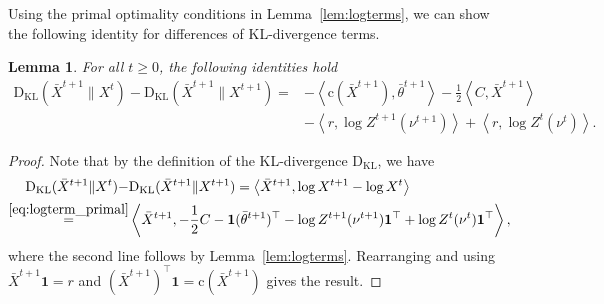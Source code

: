 \documentclass[10pt]{article}
\newcommand{\DHa}{\D_{H_c^\alpha}}
\newcommand{\inner}[2]{\left\langle #1,#2\right\rangle}
\newcommand{\D}{\operatorname{D}}
\theoremstyle{plain}
\newtheorem{lemma}[theorem]{Lemma}
\theoremstyle{definition}
\theoremstyle{remark}
\newcommand{\KL}{\mathrm{D}_\mathrm{KL}}
\newcommand{\one}{\mathbf{1}}
\newcommand{\col}{\bm{\mathrm{c}}}
\begin{document}
Using the primal optimality conditions in Lemma~\ref{lem:logterms}, we can show the following identity for differences of KL-divergence terms.
\begin{lemma}\label{lem:kl_diff}
    For all $t\geq 0$, the following identities hold
    \begin{align}
       \nonumber \KL(\bar X^{t+1}\|X^{t})-\KL(\bar X^{t+1}\|X^{t+1})=&
        -\inner{\col(\bar X^{t+1})}{\bar\theta^{t+1}}
        -\frac{1}{2}\inner{C}{\bar X^{t+1}}\\
        &-\inner{r}{\log Z^{t+1}(\nu^{t+1})}+\inner{r}{\log Z^{t}(\nu^{t})}.\label{eq:kl_diff}
    \end{align}
\end{lemma}
\begin{proof}
    Note that by the definition of the KL-divergence $\KL$, we have
    \begin{align*}
        \KL(\bar X^{t+1}\|X^{t})-&\KL(\bar X^{t+1}\|X^{t+1})=\inner{\bar X^{t+1}}{\log X^{t+1}-\log X^{t}}\\
        \stackrel{\eqref{eq:logterm_primal}}=&\inner{\bar X^{t+1}}{-\frac{1}{2}C-\one(\bar\theta^{t+1})^\top-\log Z^{t+1}(\nu^{t+1})\one^\top+\log Z^{t}(\nu^{t})\one^\top},
    \end{align*}
    where the second line follows by Lemma~\ref{lem:logterms}. Rearranging and using $\bar X^{t+1}\one=r$ and $ (\bar X^{t+1})^\top\one=\col(\bar X^{t+1})$ gives the result.
\end{proof}

\end{document}
